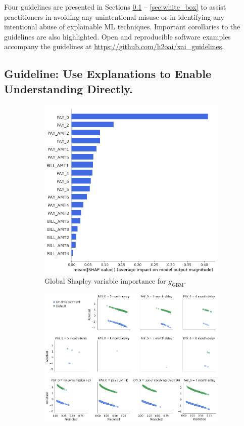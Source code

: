 \documentclass[sigconf]{acmart}
\begin{document}
Four guidelines are presented in Sections \ref{sec:trust} -- \ref{sec:white_box} to assist practitioners in avoiding any unintentional misuse or in identifying any intentional abuse of explainable ML techniques. Important corollaries to the guidelines are also highlighted. Open and reproducible software examples accompany the guidelines at \url{https://github.com/h2oai/xai_guidelines}.

\subsection{Guideline: Use Explanations to Enable Understanding Directly.} \label{sec:trust}

\begin{figure}[htb!]
	\begin{subfigure}{.4\textwidth} \centering
  		\includegraphics[height=0.8\linewidth, width=0.75\linewidth]{img/global_shap.png}
  		\caption{Global Shapley variable importance for $g_{\text{GBM}}$.}
  		\label{fig:global_shap}
	\end{subfigure}
	\begin{subfigure}{.5\textwidth} \centering
		\vspace{5pt}\includegraphics[width=0.85\linewidth]{img/resid.png}

\end{subfigure}
\end{figure}
\end{document}
